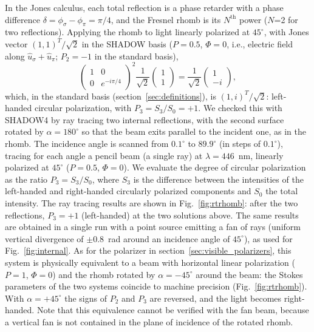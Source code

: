 \documentclass{iucr}
\begin{document}
In the Jones calculus, each total reflection is a phase retarder with a phase difference $\delta=\phi_\sigma-\phi_\pi=\pi/4$, and the Fresnel rhomb is its $N^\text{th}$ power ($N$=2 for two reflections). Applying the rhomb to light linearly polarized at $45^\circ$, with Jones vector $(1,1)^T/\sqrt{2}$ in the SHADOW basis ($P=0.5$, $\Phi=0$, i.e., electric field along $\hat{u}_\sigma+\hat{u}_\pi$; $P_2=-1$ in the standard basis),
\begin{equation}\label{eq:Jrhomb}
\begin{pmatrix}
1  &
0 \\
0&
e^{-i\pi/4}
\end{pmatrix}^2
\frac{1}{\sqrt{2}}\begin{pmatrix}
1  \\
1
\end{pmatrix} = \frac{1}{\sqrt{2}}\begin{pmatrix}
1  \\
-i
\end{pmatrix},
\end{equation}
which, in the standard basis (section~\ref{sec:definitions}), is $(1,i)^T/\sqrt{2}$: left-handed circular polarization, with $P_3=S_3/S_0=+1$.
We checked this with SHADOW4 by ray tracing two internal reflections, with the second surface rotated by $\alpha=180^\circ$ so that the beam exits parallel to the incident one, as in the rhomb. The incidence angle is scanned from $0.1^\circ$ to $89.9^\circ$ (in steps of $0.1^\circ$), tracing for each angle a pencil beam (a single ray) at $\lambda=446$~nm, linearly polarized at $45^\circ$ ($P=0.5$, $\Phi=0$). We evaluate the degree of circular polarization as the ratio $P_3=S_3/S_0$, where $S_3$ is the difference between the intensities of the left-handed and right-handed circularly polarized components and $S_0$ the total intensity. The ray tracing results are shown in Fig.~\ref{fig:rtrhomb}: after the two reflections, $P_3=+1$ (left-handed) at the two solutions above. The same results are obtained in a single run with a point source emitting a fan of rays (uniform vertical divergence of $\pm0.8$~rad around an incidence angle of $45^\circ$), as used for Fig.~\ref{fig:internal}. As for the polarizer in section~\ref{sec:visible_polarizers}, this system is physically equivalent to a beam with horizontal linear polarization ($P=1$, $\Phi=0$) and the rhomb rotated by $\alpha=-45^\circ$ around the beam: the Stokes parameters of the two systems coincide to machine precision (Fig.~\ref{fig:rtrhomb}). With $\alpha=+45^\circ$ the signs of $P_2$ and $P_3$ are reversed, and the light becomes right-handed. Note that this equivalence cannot be verified with the fan beam, because a vertical fan is not contained in the plane of incidence of the rotated rhomb.
\end{document}
